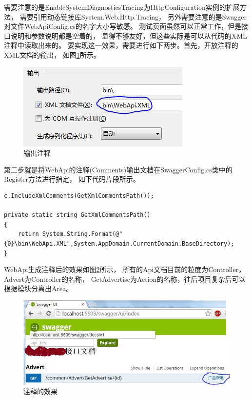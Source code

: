 \documentclass{book}
\begin{document}
需要注意的是EnableSystemDiagnosticsTracing为HttpConfiguration实例的扩展方法，
需要引用动态链接库System.Web.Http.Tracing，
另外需要注意的是Swagger对文件WebApiConfig.cs的名字大小写敏感。
测试页面虽然可以正常工作，但是接口说明和参数说明都是空着的，
显得不够友好，但这些实际是可以从代码的XML注释中读取出来的。
要实现这一效果，需要进行如下两步。首先，开放注释的XML文档的输出，
如图\ref{fig:WebApiOutputComment}所示。

\begin{figure}[htbp]
	\centering
	\includegraphics[scale=1]{WebApiOutputComment.jpg}
	\caption{输出注释}
	\label{fig:WebApiOutputComment}
\end{figure}

第二步就是将WebApi的注释(Comments)输出文档在SwaggerConfig.cs类中的Register方法进行指定，
如下代码片段所示。

\begin{lstlisting}[language={[Sharp]C},caption=Swagger指定注释文档的位置]
c.IncludeXmlComments(GetXmlCommentsPath());

private static string GetXmlCommentsPath()
{
    return System.String.Format(@"{0}\bin\WebApi.XML",System.AppDomain.CurrentDomain.BaseDirectory);
}
\end{lstlisting}

WebApi生成注释后的效果如图\ref{fig:WebApiCommentUI}所示，
所有的Api文档目前的粒度为Controller，Advert为Controller的名称，
GetAdvertise为Action的名称，往后项目复杂后可以根据模块分离出Area。

\begin{figure}[htbp]
	\centering
	\includegraphics[scale=0.8]{WebApiCommentUI.jpg}
	\caption{注释的效果}
	\label{fig:WebApiCommentUI}
\end{figure}
\end{document}
